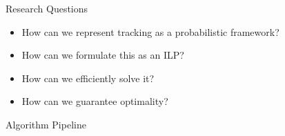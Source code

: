 \documentclass[aspectratio=43]{beamer}
\begin{document}
		\begin{frame}{Research Questions}
			\begin{itemize}
				\item How can we represent tracking as a probabilistic framework?
				\item How can we formulate this as an ILP?
				\item How can we efficiently solve it?
				\item How can we guarantee optimality?
			\end{itemize}
		\end{frame}
		
		
		\begin{frame}{Algorithm Pipeline}
			\begin{columns}
\end{columns}
\end{frame}
\end{document}

